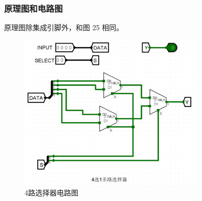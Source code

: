 \documentclass{article}
\begin{document}
    \subsubsection{原理图和电路图}
    原理图除集成引脚外，和图 25 相同。

    \begin{figure}[H]
    \centering
    \includegraphics[width=0.8\textwidth]{7.4.1.png}
    \caption{4路选择器电路图}
    \end{figure}
\end{document}
